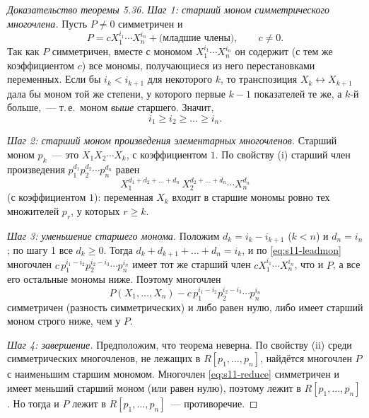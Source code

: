 \begin{proof}[Доказательство теоремы \textup{5.36}]
\emph{Шаг 1: старший моном симметрического многочлена.} Пусть $P\ne0$ симметричен и
\[
P=cX_1^{i_1}\cdots X_n^{i_n}+\text{(младшие члены)},\qquad c\ne0 .
\]
Так как $P$ симметричен, вместе с мономом $X_1^{i_1}\cdots X_n^{i_n}$ он содержит (с тем же коэффициентом $c$) все мономы,
получающиеся из него перестановками переменных. Если бы $i_k<i_{k+1}$ для некоторого $k$, то транспозиция $X_k\leftrightarrow
X_{k+1}$ дала бы моном той же степени, у которого первые $k-1$ показателей те же, а $k$-й больше,~--- т.\,е.\ моном
\emph{выше} старшего. Значит,
\[
i_1\ge i_2\ge\dots\ge i_n .
\]

\emph{Шаг 2: старший моном произведения элементарных многочленов.} Старший моном $p_k$~--- это $X_1X_2\cdots X_k$, с
коэффициентом $1$. По свойству (i) старший член произведения $p_1^{d_1}p_2^{d_2}\cdots p_n^{d_n}$ равен
\begin{equation}\label{eq:s11-leadmon}
X_1^{d_1+d_2+\dots+d_n}\,X_2^{d_2+\dots+d_n}\cdots X_n^{d_n}
\end{equation}
(с коэффициентом $1$): переменная $X_k$ входит в старшие мономы ровно тех множителей $p_r$, у которых $r\ge k$.

\emph{Шаг 3: уменьшение старшего монома.} Положим $d_k=i_k-i_{k+1}$ ($k<n$) и $d_n=i_n$; по шагу 1 все $d_k\ge0$. Тогда
$d_k+d_{k+1}+\dots+d_n=i_k$, и по \eqref{eq:s11-leadmon} многочлен $c\,p_1^{i_1-i_2}p_2^{i_2-i_3}\cdots p_n^{i_n}$ имеет тот
же старший член $cX_1^{i_1}\cdots X_n^{i_n}$, что и $P$, а все его остальные мономы ниже. Поэтому многочлен
\begin{equation}\label{eq:s11-reduce}
P(X_1,\dots,X_n)-c\,p_1^{i_1-i_2}p_2^{i_2-i_3}\cdots p_n^{i_n}
\end{equation}
симметричен (разность симметрических) и либо равен нулю, либо имеет старший моном строго ниже, чем у $P$.

\emph{Шаг 4: завершение.} Предположим, что теорема неверна. По свойству (ii) среди симметрических многочленов, не лежащих в
$R[p_1,\dots,p_n]$, найдётся многочлен $P$ с наименьшим старшим мономом. Многочлен \eqref{eq:s11-reduce} симметричен и
имеет меньший старший моном (или равен нулю), поэтому лежит в $R[p_1,\dots,p_n]$. Но тогда и $P$ лежит в
$R[p_1,\dots,p_n]$~--- противоречие.
\end{proof}

